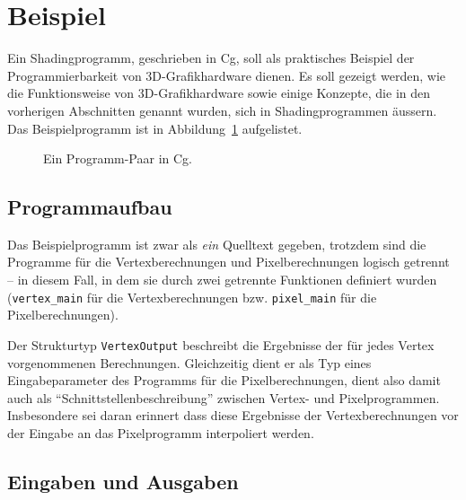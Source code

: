 \documentclass[twoside,a4paper,fleqn,12pt]{book}
\begin{document}
\section{Beispiel}


Ein Shadingprogramm, geschrieben in Cg, soll als praktisches Beispiel der Programmierbarkeit von 3D-Grafikhardware dienen.
Es soll gezeigt werden, wie die Funktionsweise von 3D-Grafikhardware sowie einige Konzepte, die in den vorherigen
Abschnitten genannt wurden, sich in Shadingprogrammen äussern. Das Beispielprogramm ist in Abbildung~\ref{fig:simple_cg} aufgelistet.

\begin{figure}[hp]
  
  \caption{Ein Programm-Paar in Cg.}
  \label{fig:simple_cg}
\end{figure}

\subsection{Programmaufbau}

Das Beispielprogramm ist zwar als \emph{ein} Quelltext gegeben, trotzdem sind die Programme für die Vertexberechnungen
und Pixelberechnungen logisch getrennt -- in diesem Fall, in dem sie durch zwei getrennte Funktionen definiert wurden
(\verb+vertex_main+ für die Vertexberechnungen bzw. \verb+pixel_main+ für die Pixelberechnungen).

Der Strukturtyp \verb+VertexOutput+ beschreibt die Ergebnisse der für jedes Vertex vorgenommenen Berechnungen.
Gleichzeitig dient er als Typ eines Eingabeparameter des Programms für die Pixelberechnungen, dient also damit
auch als "`Schnittstellenbeschreibung"' zwischen Vertex- und Pixelprogrammen. Insbesondere sei daran erinnert
dass diese Ergebnisse der Vertexberechnungen vor der Eingabe an das Pixelprogramm interpoliert werden.

\subsection{Eingaben und Ausgaben}
\end{document}
